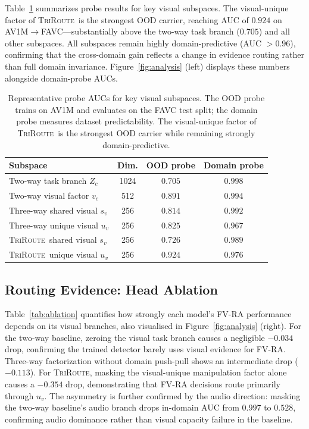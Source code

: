 \documentclass{article}
\newcommand{\method}{\textsc{TriRoute}}
\begin{document}
Table~\ref{tab:probe} summarizes probe results for key visual subspaces. The visual-unique factor of \method\ is the strongest OOD carrier, reaching AUC of $0.924$ on AV1M$\rightarrow$FAVC---substantially above the two-way task branch ($0.705$) and all other subspaces. All subspaces remain highly domain-predictive (AUC $>0.96$), confirming that the cross-domain gain reflects a change in evidence routing rather than full domain invariance. Figure~\ref{fig:analysis} (left) displays these numbers alongside domain-probe AUCs.

\begin{table}[t]
    \centering
    \caption{Representative probe AUCs for key visual subspaces. The OOD probe trains on AV1M and evaluates on the FAVC test split; the domain probe measures dataset predictability. The visual-unique factor of \method\ is the strongest OOD carrier while remaining strongly domain-predictive.}
    \label{tab:probe}
    \small
    \begin{tabular}{lccc}
        \toprule
        Subspace & Dim. & OOD probe & Domain probe \\
        \midrule
        Two-way task branch $Z_c$ & 1024 & $0.705$ & $0.998$ \\
        Two-way visual factor $v_c$ & 512 & $0.891$ & $0.994$ \\
        Three-way shared visual $s_v$ & 256 & $0.814$ & $0.992$ \\
        Three-way unique visual $u_v$ & 256 & $0.825$ & $0.967$ \\
        \method\ shared visual $s_v$ & 256 & $0.726$ & $0.989$ \\
        \method\ unique visual $u_v$ & 256 & $\mathbf{0.924}$ & $0.976$ \\
        \bottomrule
    \end{tabular}
\end{table}

\subsection{Routing Evidence: Head Ablation}

Table~\ref{tab:ablation} quantifies how strongly each model's FV-RA performance depends on its visual branches, also visualised in Figure~\ref{fig:analysis} (right). For the two-way baseline, zeroing the visual task branch causes a negligible $-0.034$ drop, confirming the trained detector barely uses visual evidence for FV-RA. Three-way factorization without domain push-pull shows an intermediate drop ($-0.113$). For \method, masking the visual-unique manipulation factor alone causes a $-0.354$ drop, demonstrating that FV-RA decisions route primarily through $u_v$. The asymmetry is further confirmed by the audio direction: masking the two-way baseline's audio branch drops in-domain AUC from $0.997$ to $0.528$, confirming audio dominance rather than visual capacity failure in the baseline.
\end{document}
